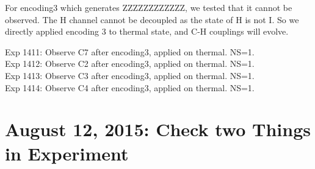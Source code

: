 \documentclass[prl,onecolumn]{revtex4-1}
\begin{document}
For encoding3 which generates ZZZZZZZZZZZZ, we tested that it cannot be observed. The H channel cannot be decoupled as the state of H is not I. So we directly applied encoding 3 to thermal state, and C-H couplings will evolve.

Exp 1411: Observe C7 after encoding3, applied on thermal. NS=1.\\
Exp 1412: Observe C2 after encoding3, applied on thermal. NS=1.\\
Exp 1413: Observe C3 after encoding3, applied on thermal. NS=1.\\
Exp 1414: Observe C4 after encoding3, applied on thermal. NS=1.\\






\clearpage
\section{August 12, 2015: Check two Things in Experiment}



\begin{thebibliography}{99}

\end{thebibliography}
\end{document}
